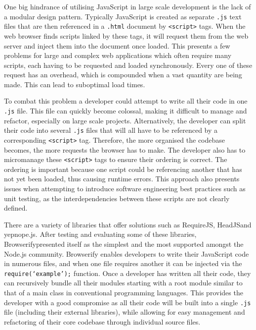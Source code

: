 \documentclass[final]{cmpreport}
\begin{document}
One big hindrance of utilising JavaScript in large scale development is the lack of a modular design pattern. Typically JavaScript is created as separate \texttt{.js} text files that are then referenced in a \texttt{.html} document by \texttt{<script>} tags. When the web browser finds scripts linked by these tags, it will request them from the web server and inject them into the document once loaded. This presents a few problems for large and complex web applications which often require many scripts, each having to be requested and loaded synchronously. Every one of these request has an overhead, which is compounded when a vast quantity are being made. This can lead to suboptimal load times.

To combat this problem a developer could attempt to write all their code in one \texttt{.js} file. This file can quickly become colossal, making it difficult to manage and refactor, especially on large scale projects. Alternatively, the developer can split their code into several \texttt{.js} files that will all have to be referenced by a corresponding \texttt{<script>} tag. Therefore, the more organised the codebase becomes, the more requests the browser has to make. The developer also has to micromanage these \texttt{<script>} tags to ensure their ordering is correct. The ordering is important because one script could be referencing another that has not yet been loaded, thus causing runtime errors. This approach also presents issues when attempting to introduce software engineering best practices such as unit testing, as the interdependencies between these scripts are not clearly defined.

There are a variety of libraries that offer solutions such as RequireJS\footnotemark, HeadJS\footnotemark and yepnope.js\footnotemark. After testing and evaluating some of these libraries, Browserify\footnotemark presented itself as the simplest and the most supported amongst the Node.js community. Browserify enables developers to write their JavaScript code in numerous files, and when one file requires another it can be injected via the \texttt{require(`example');} function. Once a developer has written all their code, they can recursively bundle all their modules starting with a root module similar to that of a main class in conventional programming languages. This provides the developer with a good compromise as all their code will be built into a single \texttt{.js} file (including their external libraries), while allowing for easy management and refactoring of their core codebase through individual source files.
\end{document}
